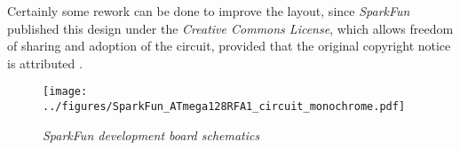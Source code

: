   Certainly some rework can be done to improve the layout, since \emph{SparkFun}
 published this design under the \emph{Creative Commons License}, which allows
 freedom of sharing and adoption of the circuit, provided that the original
 copyright notice is attributed \cite{links:license:cc:by:sa:3:0, links:wiki:cclic}.

\pagebreak

\begin{figure}
\texttt{[image: ../figures/SparkFun\_ATmega128RFA1\_circuit\_monochrome.pdf]}
\caption{\emph{SparkFun development board schematics}} \label{fig:sparkfun:atmega128rfa1:circuit}
\end{figure}
